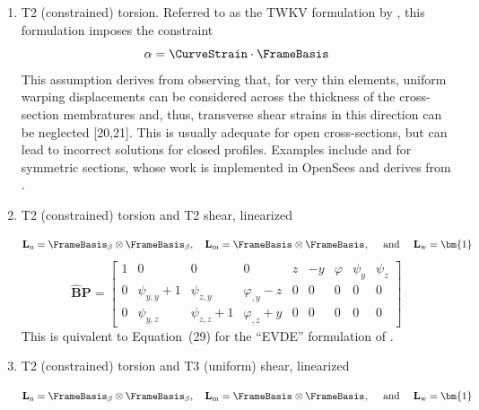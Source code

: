 \begin{enumerate}
\item T2 (constrained) torsion. Referred to as the TWKV formulation by \cite{armero2021modeling}, this formulation imposes the constraint 
  \[
  \alpha = \CurveStrain \cdot \FrameBasis
  \]
  This assumption derives from observing that, for very thin elements, uniform warping displacements can be considered across the thickness of the cross-section membratures and, thus, transverse shear strains in this direction can be neglected [20,21]. This is usually adequate for open cross-sections, but can lead to incorrect solutions for closed profiles.
  Examples include \cite{nukala2004mixed} and \cite{zhang2011formulation} for symmetric sections, whose work is implemented in OpenSees and derives from \cite{alemdar2001distributed}.

\item T2 (constrained) torsion and T2 shear, linearized

$$
\mathbf{L}_{\mathrm{n}} = \FrameBasis_{\beta} \otimes \FrameBasis_{\beta}, \quad
\mathbf{L}_{\mathrm{m}} = \FrameBasis_{} \otimes \FrameBasis_{},
\quad\text{ and }\quad
\mathbf{L}_{\mathrm{w}} = \bm{1}
$$
$$
\hat{\bm{B}}\mathbf{P} = \left[\begin{matrix}
1 & 0 & 0 & 0 & z & - y & \varphi & \psi_{y} & \psi_{z}\\
0 & \psi_{y,y} + 1 & \psi_{z,y} & \varphi_{,y} - z & 0 & 0 & 0 & 0 & 0\\
0 & \psi_{y,z} & \psi_{z,z} + 1 & \varphi_{,z} + y & 0 & 0 & 0 & 0 & 0\end{matrix}\right]
$$
This is quivalent to Equation~(29) for the ``EVDE'' formulation of  \cite{addessi2021enriched}. 
\item T2 (constrained) torsion and T3 (uniform) shear, linearized

$$
\mathbf{L}_{\mathrm{n}} = \FrameBasis_{\beta} \otimes \FrameBasis_{\beta}, \quad
\mathbf{L}_{\mathrm{m}} = \FrameBasis_{} \otimes \FrameBasis_{},
\quad\text{ and }\quad
\mathbf{L}_{\mathrm{w}} = \bm{1}
$$


\end{enumerate}
